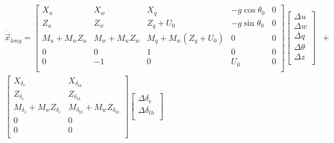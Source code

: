 \begin{align*}
    \dot{\vec{x}}_{long} =
    \left[ \begin{array}{ *{5}{c} }
            X_u                     & X_w                     & X_q                                          & -g \cos \theta_0 & 0 \\
            Z_u                     & Z_w                     & Z_q + U_0                                    & -g \sin \theta_0 & 0 \\
            M_u + M_{\dot{w}} Z_{u} & M_w + M_{\dot{w}} Z_{w} & M_q + M_{\dot{w}} \left( Z_{q} + U_0 \right) & 0                & 0 \\
            0                       & 0                       & 1                                            & 0                & 0 \\
            0                       & -1                      & 0                                            & U_0              & 0 \\
        \end{array} \right]
    \left[ \begin{array}{ *{1}{c} }
            \Delta u      \\
            \Delta w      \\
            \Delta q      \\
            \Delta \theta \\
            \Delta z      \\
        \end{array} \right] & + \\
    \left[ \begin{array}{ *{5}{c} }
            X_{\delta_e}                            & X_{\delta_{th}}                               \\
            Z_{\delta_e}                            & Z_{\delta_{th}}                               \\
            M_{\delta_e} + M_{\dot{w}} Z_{\delta_e} & M_{\delta_{th}} + M_{\dot{w}} Z_{\delta_{th}} \\
            0                                       & 0                                             \\
            0                                       & 0                                             \\
        \end{array} \right]
    \left[ \begin{array}{ *{1}{c} }
            \Delta \delta_e    \\
            \Delta \delta_{th} \\
        \end{array} \right] &   \\
\end{align*}

